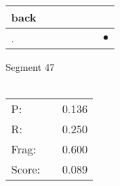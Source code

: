 \documentclass[landscape]{article}
\newcommand{\ssp}{\hspace{2pt}}
\newcommand{\mex}{\cellcolor{g}$\bullet$}
\begin{document}
\begin{tabular}{|l|p{10pt}|p{10pt}|p{10pt}|p{10pt}|p{10pt}|p{10pt}|}
\hline
\ssp back \ssp&\hspace{2pt}&\hspace{2pt}&\hspace{2pt}&\hspace{2pt}&\hspace{2pt}&\hspace{2pt}\\
\hline
\ssp \cellcolor{ref5}. \ssp&\hspace{2pt}&\hspace{2pt}&\hspace{2pt}&\hspace{2pt}&\hspace{2pt}&\hspace{2pt}\mex\\
\hline
\end{tabular}

\vspace{6pt}
\noindent Segment 47\\\\
\noindent\begin{tabular}{lm{12pt}r}
\hline
P:&&0.136\\
R:&&0.250\\
Frag:&&0.600\\
Score:&&0.089\\
\end{tabular}

\newpage
\end{document}
